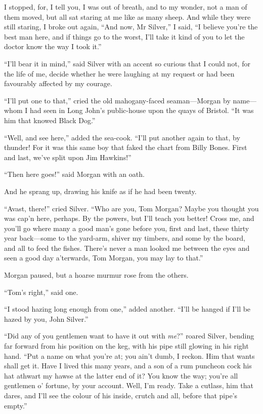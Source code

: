 I stopped, for, I tell you, I was out of breath, and to my wonder, not a man of them moved, but all sat staring at me like as many sheep. And while they were still staring, I broke out again, \enquote{And now, Mr Silver,} I said, \enquote{I believe you’re the best man here, and if things go to the worst, I’ll take it kind of you to let the doctor know the way I took it.}

\enquote{I’ll bear it in mind,} said Silver with an accent so curious that I could not, for the life of me, decide whether he were laughing at my request or had been favourably affected by my courage.

\enquote{I’ll put one to that,} cried the old mahogany-faced seaman---Morgan by name---whom I had seen in Long John’s public-house upon the quays of Bristol. \enquote{It was him that knowed Black Dog.}

\enquote{Well, and see here,} added the sea-cook. \enquote{I’ll put another again to that, by thunder! For it was this same boy that faked the chart from Billy Bones. First and last, we’ve split upon Jim Hawkins!}

\enquote{Then here goes!} said Morgan with an oath.

And he sprang up, drawing his knife as if he had been twenty.

\enquote{Avast, there!} cried Silver. \enquote{Who are you, Tom Morgan? Maybe you thought you was cap’n here, perhaps. By the powers, but I’ll teach you better! Cross me, and you’ll go where many a good man’s gone before you, first and last, these thirty year back---some to the yard-arm, shiver my timbers, and some by the board, and all to feed the fishes. There’s never a man looked me between the eyes and seen a good day a’terwards, Tom Morgan, you may lay to that.}

Morgan paused, but a hoarse murmur rose from the others.

\enquote{Tom’s right,} said one.

\enquote{I stood hazing long enough from one,} added another. \enquote{I’ll be hanged if I’ll be hazed by you, John Silver.}

\enquote{Did any of you gentlemen want to have it out with \textit{me}?} roared Silver, bending far forward from his position on the keg, with his pipe still glowing in his right hand. \enquote{Put a name on what you’re at; you ain’t dumb, I reckon. Him that wants shall get it. Have I lived this many years, and a son of a rum puncheon cock his hat athwart my hawse at the latter end of it? You know the way; you’re all gentlemen o’ fortune, by your account. Well, I’m ready. Take a cutlass, him that dares, and I’ll see the colour of his inside, crutch and all, before that pipe’s empty.}

